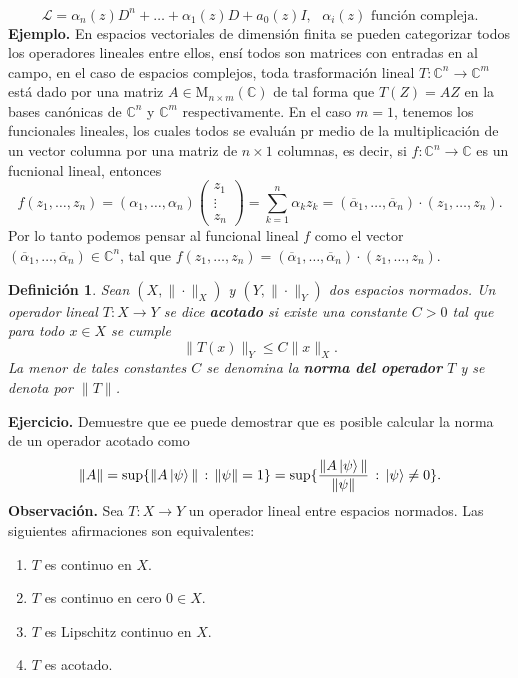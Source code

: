 \documentclass[letterpaper]{book}
\newtheorem{def.}{Definici\'on}[section]
\newcommand{\exe}{{\noindent \sc \textbf{Ejercicio. }}}
\newcommand{\eje}{{\noindent \sc \textbf{Ejemplo. }}}
\newcommand{\obs}{{\noindent \sc \textbf{Observación. }}}
\newcommand{\co}{\ensuremath{\mathbb C }}
\newcommand{\con}{\ensuremath{\mathbb{C}^n}}
\begin{document}
\[
    \mathcal{L}=\alpha_n(z)D^n+\dots+\alpha_1(z)D+a_0(z)I,\text{ $\alpha_i(z)$ función compleja.}
\]
\eje En espacios vectoriales de dimensión finita se pueden categorizar todos los operadores lineales entre ellos, ensí todos son matrices con entradas en al campo, en el caso de espacios complejos, toda trasformación lineal \(T:\co^n\rightarrow\co^m\) está dado por una matriz \(A\in\textrm{M}_{n\times m}(\co)\) de tal forma que \(T(Z)=AZ\) en la bases canónicas de \(\co^n\) y \(\co^m\) respectivamente. En el caso \(m=1\), tenemos los funcionales lineales, los cuales todos se evaluán pr medio de la multiplicación de un vector columna por una matriz de \(n\times 1\) columnas, es decir, si \(f:\co^n\rightarrow\co\) es un fucnional lineal, entonces
\[
f(z_1,\dots,z_n)=(\alpha_1,\dots,\alpha_n)\begin{pmatrix}z_1\\ \vdots \\ z_n\end{pmatrix}=\sum_{k=1}^n \alpha_kz_k = (\overline{\alpha}_1,\dots,\overline{\alpha}_n)\cdot(z_1,\dots,z_n).
\]
\noindent Por lo tanto podemos pensar al funcional lineal \(f\) como el vector \((\overline{\alpha}_1,\dots,\overline{\alpha}_n)\in\con\), tal que \(f(z_1,\dots,z_n)=(\overline{\alpha}_1,\dots,\overline{\alpha}_n)\cdot(z_1,\dots,z_n)\).

\begin{def.}
Sean \((X, \|\cdot\|_X)\) y \((Y, \|\cdot\|_Y)\) dos espacios normados. Un operador lineal \(T: X \to Y\) se dice \textbf{acotado} si existe una constante \(C > 0\) tal que para todo \(x \in X\) se cumple
\[
\|T(x)\|_Y \leq C \|x\|_X.
\]
La menor de tales constantes \(C\) se denomina la \textbf{norma del operador} \(T\) y se denota por \(\|T\|\).
\end{def.}
\exe Demuestre que ee puede demostrar que es posible calcular la norma de un operador acotado como
\[
\|A\|=\sup\{\|A\ket{\psi}\|\,:\,\|\psi\|=1\}=\sup\{\frac{\|A\ket{\psi}\|}{\|\psi\|}\,:\,\ket{\psi}\neq 0\}.
\]
\obs Sea \(T: X \to Y\) un operador lineal entre espacios normados. Las siguientes afirmaciones son equivalentes:
\begin{enumerate}
    \item \(T\) es continuo en \(X\).
    \item \(T\) es continuo en cero \(0 \in X\).
    \item \(T\) es Lipschitz continuo en \(X\).
    \item \(T\) es acotado.
\end{enumerate}
\end{document}
